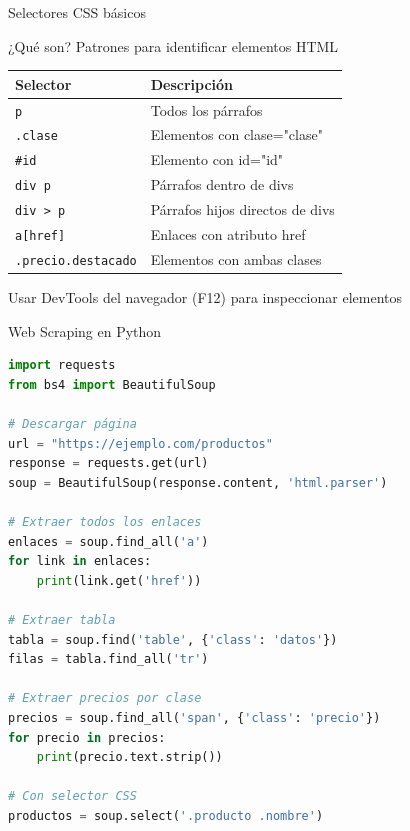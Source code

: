 \documentclass[aspectratio=169]{beamer}
\begin{document}
\begin{frame}{Selectores CSS básicos}
\begin{block}{¿Qué son?}
Patrones para identificar elementos HTML
\end{block}

\begin{center}
\begin{tabular}{|l|l|}
\hline
\textbf{Selector} & \textbf{Descripción} \\
\hline
\texttt{p} & Todos los párrafos \\
\texttt{.clase} & Elementos con clase="clase" \\
\texttt{\#id} & Elemento con id="id" \\
\texttt{div p} & Párrafos dentro de divs \\
\texttt{div > p} & Párrafos hijos directos de divs \\
\texttt{a[href]} & Enlaces con atributo href \\
\texttt{.precio.destacado} & Elementos con ambas clases \\
\hline
\end{tabular}
\end{center}

\vspace{0.5em}
\small{Usar DevTools del navegador (F12) para inspeccionar elementos}
\end{frame}

\begin{frame}[fragile]{Web Scraping en Python}
\begin{lstlisting}[language=Python]
import requests
from bs4 import BeautifulSoup

# Descargar página
url = "https://ejemplo.com/productos"
response = requests.get(url)
soup = BeautifulSoup(response.content, 'html.parser')

# Extraer todos los enlaces
enlaces = soup.find_all('a')
for link in enlaces:
    print(link.get('href'))

# Extraer tabla
tabla = soup.find('table', {'class': 'datos'})
filas = tabla.find_all('tr')

# Extraer precios por clase
precios = soup.find_all('span', {'class': 'precio'})
for precio in precios:
    print(precio.text.strip())

# Con selector CSS
productos = soup.select('.producto .nombre')
\end{lstlisting}
\end{frame}
\end{document}
